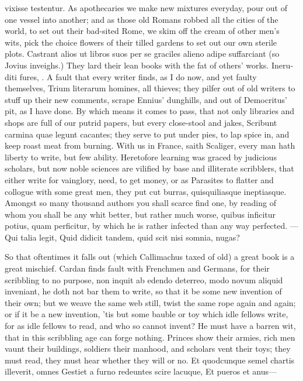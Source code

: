 {vixisse testentur. As apothecaries we make new mixtures everyday, pour
out of one vessel into another; and as those old Romans robbed all the
cities of the world, to set out their bad-sited Rome, we skim off the
cream of other men's wits, pick the choice flowers of their tilled
gardens to set out our own sterile plots. Castrant alios ut libros suos
per se graciles alieno adipe suffarciant (so Jovius inveighs.) They
lard their lean books with the fat of others' works. \textlatin{Ineruditi fures},
\etc. A fault that every writer finds, as I do now, and yet faulty
themselves, Trium literarum homines, all thieves; they pilfer out
of old writers to stuff up their new comments, scrape Ennius'
dunghills, and out of Democritus' pit, as I have done. By which
means it comes to pass, that not only libraries and shops are full
of our putrid papers, but every close-stool and jakes, Scribunt carmina
quae legunt cacantes; they serve to put under pies, to lap spice
in, and keep roast meat from burning. With us in France, saith
Scaliger, every man hath liberty to write, but few ability.
Heretofore learning was graced by judicious scholars, but now noble
sciences are vilified by base and illiterate scribblers, that either
write for vainglory, need, to get money, or as Parasites to flatter and
collogue with some great men, they put cut burras, quisquiliasque
ineptiasque. Amongst so many thousand authors you shall scarce find
one, by reading of whom you shall be any whit better, but rather much
worse, quibus inficitur potius, quam perficitur, by which he is rather
infected than any way perfected.
---Qui talia legit,
Quid didicit tandem, quid scit nisi somnia, nugas?

So that oftentimes it falls out (which Callimachus taxed of old) a
great book is a great mischief. Cardan finds fault with Frenchmen
and Germans, for their scribbling to no purpose, non inquit ab edendo
deterreo, modo novum aliquid inveniant, he doth not bar them to write,
so that it be some new invention of their own; but we weave the same
web still, twist the same rope again and again; or if it be a new
invention, 'tis but some bauble or toy which idle fellows write, for as
idle fellows to read, and who so cannot invent? He must have a
barren wit, that in this scribbling age can forge nothing. Princes
show their armies, rich men vaunt their buildings, soldiers their
manhood, and scholars vent their toys; they must read, they must hear
whether they will or no.
Et quodcunque semel chartis illeverit, omnes
Gestiet a furno redeuntes scire lacuque,
Et pueros et anus---

}
